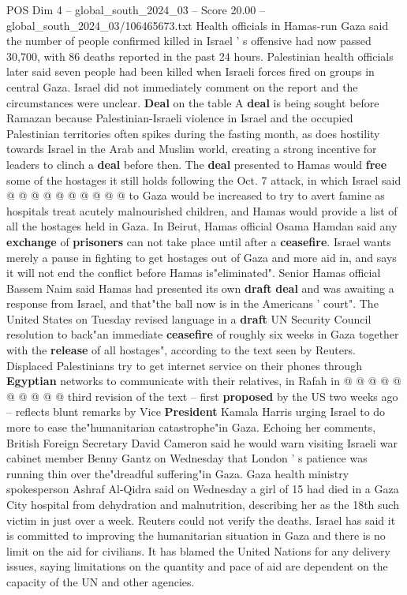 \begin{textsample}{POS Dim 4 – global\_south\_2024\_03 – Score 20.00 – global\_south\_2024\_03/106465673.txt}
Health officials in Hamas-run Gaza said the number of people confirmed killed in Israel ' s offensive had now passed 30,700, with 86 deaths reported in the past 24 hours.
Palestinian health officials later said seven people had been killed when Israeli forces fired on groups in central Gaza.
Israel did not immediately comment on the report and the circumstances were unclear. \textbf{Deal} on the table A \textbf{deal} is being sought before Ramazan because Palestinian-Israeli violence in Israel and the occupied Palestinian territories often spikes during the fasting month, as does hostility towards Israel in the Arab and Muslim world, creating a strong incentive for leaders to clinch a \textbf{deal} before then.
The \textbf{deal} presented to Hamas would \textbf{free} some of the hostages it still holds following the Oct. 7 attack, in which Israel said @ @ @ @ @ @ @ @ @ @ to Gaza would be increased to try to avert famine as hospitals treat acutely malnourished children, and Hamas would provide a list of all the hostages held in Gaza.
In Beirut, Hamas official Osama Hamdan said any \textbf{exchange} of \textbf{prisoners} can not take place until after a \textbf{ceasefire}.
Israel wants merely a pause in fighting to get hostages out of Gaza and more aid in, and says it will not end the conflict before Hamas is"eliminated".
Senior Hamas official Bassem Naim said Hamas had presented its own \textbf{draft} \textbf{deal} and was awaiting a response from Israel, and that"the ball now is in the Americans ' court".
The United States on Tuesday revised language in a \textbf{draft} UN Security Council resolution to back"an immediate \textbf{ceasefire} of roughly six weeks in Gaza together with the \textbf{release} of all hostages", according to the text seen by Reuters.
Displaced Palestinians try to get internet service on their phones through \textbf{Egyptian} networks to communicate with their relatives, in Rafah in @ @ @ @ @ @ @ @ @ @ third revision of the text -- first \textbf{proposed} by the US two weeks ago -- reflects blunt remarks by Vice \textbf{President} Kamala Harris urging Israel to do more to ease the"humanitarian catastrophe"in Gaza.
Echoing her comments, British Foreign Secretary David Cameron said he would warn visiting Israeli war cabinet member Benny Gantz on Wednesday that London ' s patience was running thin over the"dreadful suffering"in Gaza.
Gaza health ministry spokesperson Ashraf Al-Qidra said on Wednesday a girl of 15 had died in a Gaza City hospital from dehydration and malnutrition, describing her as the 18th such victim in just over a week.
Reuters could not verify the deaths.
Israel has said it is committed to improving the humanitarian situation in Gaza and there is no limit on the aid for civilians.
It has blamed the United Nations for any delivery issues, saying limitations on the quantity and pace of aid are dependent on the capacity of the UN and other agencies.

\end{textsample}
